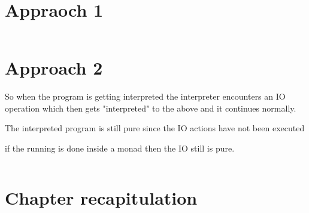 \documentclass[thesis-solanki.tex]{subfiles}
\begin{document}
\section{Appraoch 1}

\begin{code-list}[H]

\begin{singlespace}
  \inputminted[linenos]{haskell}{haskell-proto4-myrtle-uppers.hs}
\end{singlespace}

\caption{}
\label{}
\end{code-list}


\section{Approach 2}

So when the program is getting interpreted the interpreter encounters an IO operation which then gets "interpreted" to the above and it 
continues normally.

The interpreted program is still pure since the IO actions have not been executed 

if the running is done inside a monad then the IO still is pure.


\begin{code-list}[H]
\begin{singlespace}

  \inputminted[linenos]{haskell}{haskell-proto4-platen-winkel.hs}
\end{singlespace}
\caption{}
\label{}
\end{code-list}



\section{Chapter recapitulation}

\ifMain
\begin{scope}
  \nolinenumbers
  \enotesize
  \par
  \begin{singlespace}
  \setlength{\parskip}{12pt plus 2pt minus 1pt}
  \theendnotes
  \par
  \end{singlespace}
\end{scope}
\fi
\end{document}
